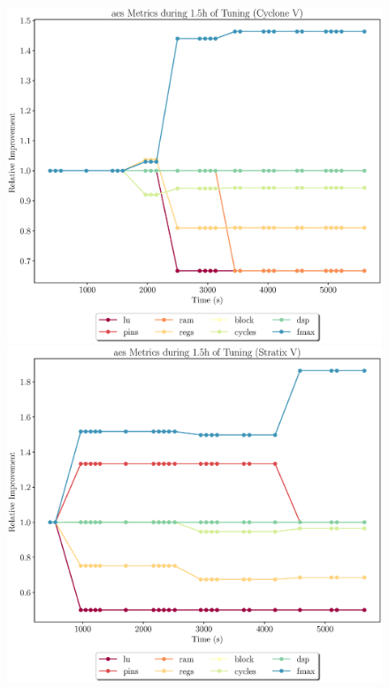 \documentclass[12pt, a4paper]{article}
\begin{document}
\newpage

\begin{figure}[htpb]
    \centering
    \begin{minipage}{.48\textwidth}
        \centering
        \includegraphics[scale=.25]{aes_all_5400_chstone_CycloneV}
    \end{minipage}%
    \hfill
    \begin{minipage}{.48\textwidth}
        \centering
        \includegraphics[scale=.25]{aes_all_5400_chstone_StratixV}
    \end{minipage}%


\end{figure}
\end{document}
